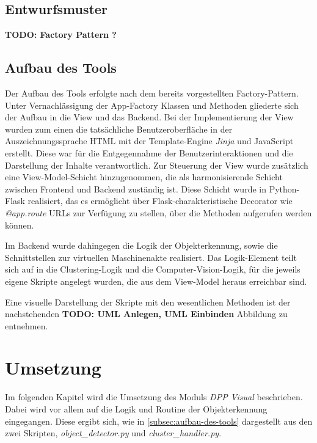\documentclass[
    type=Projektarbeit,
    status=draft, %
    language=german, %
    bibengine=bibtex,
]{unibwm-inf-thesis}
\newcommand{\todo}[1]{\textbf{TODO: #1}}
\begin{document}
    \subsection{Entwurfsmuster}\label{subsec:entwurfsmuster}
    \todo{Factory Pattern ?}

    \subsection{Aufbau des Tools} \label{subsec:aufbau-des-tools}
    Der Aufbau des Tools erfolgte nach dem bereits vorgestellten Factory-Pattern. 
    Unter Vernachlässigung der App-Factory Klassen und Methoden gliederte sich der Aufbau in die View und das Backend.
    Bei der Implementierung der View wurden zum einen die tatsächliche Benutzeroberfläche in der Auszeichnungssprache HTML mit der Template-Engine \textit{Jinja} und JavaScript erstellt.
    Diese war für die Entgegennahme der Benutzerinteraktionen und die Darstellung der Inhalte verantwortlich.
    Zur Steuerung der View wurde zusätzlich eine View-Model-Schicht hinzugenommen, die als harmonisierende Schicht zwischen Frontend und Backend zuständig ist.
    Diese Schicht wurde in Python-Flask realisiert, das es ermöglicht über Flask-charakteristische Decorator wie \textit{@app.route} URLs zur Verfügung zu stellen, über die Methoden aufgerufen werden können.

    Im Backend wurde dahingegen die Logik der Objekterkennung, sowie die Schnittstellen zur virtuellen Maschinenakte realisiert.
    Das Logik-Element teilt sich auf in die Clustering-Logik und die Computer-Vision-Logik, für die jeweils eigene Skripte angelegt wurden, die aus dem View-Model heraus erreichbar sind.

    Eine visuelle Darstellung der Skripte mit den wesentlichen Methoden ist der nachstehenden \todo{UML Anlegen, UML Einbinden} Abbildung zu entnehmen.
    
    \section{Umsetzung}
    Im folgenden Kapitel wird die Umsetzung des Moduls \textit{DPP Visual} beschrieben.
    Dabei wird vor allem auf die Logik und Routine der Objekterkennung eingegangen.
    Diese ergibt sich, wie in \autoref{subsec:aufbau-des-tools} dargestellt aus den zwei Skripten, \textit{object\_detector.py} und \textit{cluster\_handler.py}.
\end{document}
